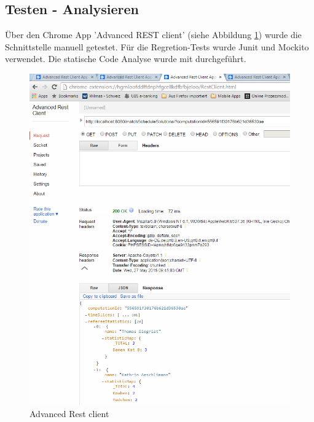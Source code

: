 \subsection{Testen - Analysieren}
 Über den Chrome App 'Advanced REST client' (siehe Abbildung \ref{fig:advanced_rest_client})  wurde die Schnittstelle manuell getestet. Für die Regretion-Tests wurde Junit und Mockito 
verwendet. Die statische Code Analyse wurde mit  \cite{sonar} durchgeführt.

\begin{figure}[h]
\centering
\includegraphics[scale=0.7]{images/advanced_rest_client.png}
\caption[Advanced Rest client]{Advanced Rest client \selfmade{}}
\label{fig:advanced_rest_client}
\end{figure}